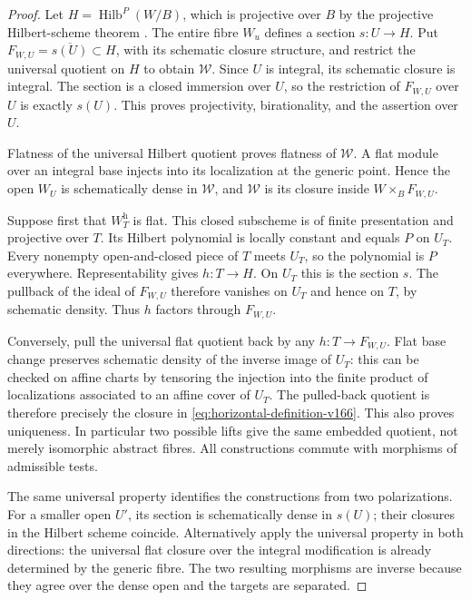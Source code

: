 \documentclass[11pt,reqno]{amsart}
\numberwithin{equation}{section}
\theoremstyle{definition}\newtheorem{definition}[theorem]{Definition}
\theoremstyle{remark}\newtheorem{remark}[theorem]{Remark}
\begin{document}
\begin{proof}
Let $H=\operatorname{Hilb}^{P}(W/B)$, which is projective over $B$
by the projective Hilbert-scheme theorem \cite{Grothendieck166}.
The entire fibre $W_u$ defines a section $s:U\to H$. Put
$F_{W,U}=\overline{s(U)}\subset H$, with its schematic closure
structure, and restrict the universal quotient on $H$ to obtain
$\mathcal W$. Since $U$ is integral, its schematic closure is integral.
The section is a closed immersion over $U$, so the restriction of
$F_{W,U}$ over $U$ is exactly $s(U)$. This proves projectivity,
birationality, and the assertion over $U$.

Flatness of the universal Hilbert quotient proves flatness of
$\mathcal W$. A flat module over an integral base injects into its
localization at the generic point. Hence the open $W_U$ is
schematically dense in $\mathcal W$, and $\mathcal W$ is its closure
inside $W\times_B F_{W,U}$.

Suppose first that $W_T^{\mathrm h}$ is flat. This closed subscheme
is of finite presentation and projective over $T$. Its Hilbert
polynomial is locally constant and equals $P$ on $U_T$. Every
nonempty open-and-closed piece of $T$ meets $U_T$, so the polynomial
is $P$ everywhere. Representability gives $h:T\to H$. On $U_T$ this
is the section $s$. The pullback of the ideal of $F_{W,U}$ therefore
vanishes on $U_T$ and hence on $T$, by schematic density. Thus $h$
factors through $F_{W,U}$.

Conversely, pull the universal flat quotient back by any
$h:T\to F_{W,U}$. Flat base change preserves schematic density of
the inverse image of $U_T$: this can be checked on affine charts by
tensoring the injection into the finite product of localizations
associated to an affine cover of $U_T$. The pulled-back quotient is
therefore precisely the closure in \eqref{eq:horizontal-definition-v166}.
This also proves uniqueness. In particular two possible lifts give
the same embedded quotient, not merely isomorphic abstract fibres.
All constructions commute with morphisms of admissible tests.

The same universal property identifies the constructions from two
polarizations. For a smaller open $U'$, its section is schematically
dense in $s(U)$; their closures in the Hilbert scheme coincide.
Alternatively apply the universal property in both directions: the
universal flat closure over the integral modification is already
determined by the generic fibre. The two resulting morphisms are
inverse because they agree over the dense open and the targets are
separated.
\end{proof}
\end{document}
